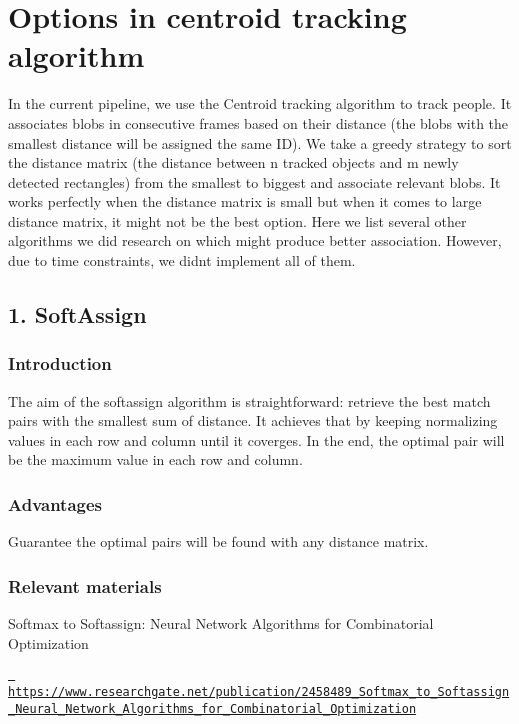 \section*{Options in centroid tracking algorithm}

In the current pipeline, we use the Centroid tracking algorithm to track people. It associates blobs in consecutive frames based on their distance (the blobs with the smallest distance will be assigned the same ID). We take a greedy strategy to sort the distance matrix (the distance between n tracked objects and m newly detected rectangles) from the smallest to biggest and associate relevant blobs. It works perfectly when the distance matrix is small but when it comes to large distance matrix, it might not be the best option. Here we list several other algorithms we did research on which might produce better association. However, due to time constraints, we didn\textquotesingle{}t implement all of them.

\subsection*{1. Soft\+Assign}

\subsubsection*{Introduction}

The aim of the softassign algorithm is straightforward\+: retrieve the best match pairs with the smallest sum of distance. It achieves that by keeping normalizing values in each row and column until it coverges. In the end, the optimal pair will be the maximum value in each row and column.

\subsubsection*{Advantages}

Guarantee the optimal pairs will be found with any distance matrix.

\subsubsection*{Relevant materials}

Softmax to Softassign\+: Neural Network Algorithms for Combinatorial Optimization

\href{https://www.researchgate.net/publication/2458489_Softmax_to_Softassign_Neural_Network_Algorithms_for_Combinatorial_Optimization}{\texttt{ https\+://www.\+researchgate.\+net/publication/2458489\+\_\+\+Softmax\+\_\+to\+\_\+\+Softassign\+\_\+\+Neural\+\_\+\+Network\+\_\+\+Algorithms\+\_\+for\+\_\+\+Combinatorial\+\_\+\+Optimization}}

